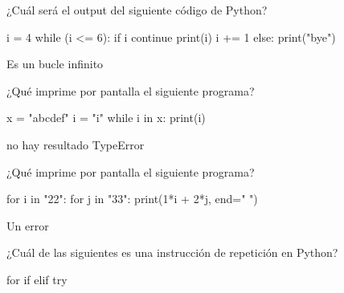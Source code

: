 \begin{ejercicio} ¿Cuál será el output del siguiente código de Python?
\begin{python}
i = 4
while (i <= 6):
    if i%
        continue
    print(i)
    i += 1
else:
    print("bye")
\end{python}

\begin{choices}
    \choice  Es un bucle infinito   %
    \choice   {}
    \choice  {}
    \choice   {}
\end{choices}

\end{ejercicio}


\begin{ejercicio} ¿Qué imprime por pantalla el siguiente programa?

\begin{python}
x = "abcdef"
i = "i"
while i in x:
    print(i)
\end{python}

\begin{choices}
    \choice no hay resultado   %
    \choice {}
    \choice {}
    \choice TypeError
\end{choices}
\end{ejercicio}



\begin{ejercicio} ¿Qué imprime por pantalla el siguiente programa?

\begin{python}
for i in "22":
    for j in "33":
        print(1*i + 2*j, end=" ")
\end{python}


\begin{choices}
    \choice 
{}

\choice 
{}

\choice    %
\choice Un error
\end{choices}
\end{ejercicio}

\begin{ejercicio} ¿Cuál de las siguientes es una instrucción de repetición en Python? 

\begin{choices}
    \choice for   %
    \choice if
    \choice elif
    \choice try
\end{choices}

\end{ejercicio}


